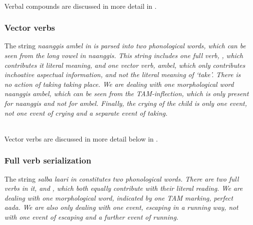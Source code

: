 \\

Verbal compounds are discussed in more detail in .

\subsubsection{Vector verbs}\label{sec:wc:mvc:Vectorverbs}
The string \em naanggis ambel \em in  is parsed into two phonological words, which can be seen from the long vowel in \em naanggis\em. This string includes one full verb, , which contributes it literal meaning, and one vector verb, \em ambel\em, which only contributes inchoative aspectual information, and not the literal meaning of `take'. There is no action of taking taking place. We are dealing with one morphological word   \em naanggis ambel\em, which can be seen from the TAM-inflection, which is only present for \em naanggis \em and not for \em ambel\em. Finally, the crying of the child is only one event, not one event of crying and a separate event of taking.

 \\
Vector verbs are discussed in more detail below in .
 
\subsubsection{Full verb serialization}\label{sec:wc:mvc:Fullverbserialization}
The string \em salba laari \em in  constitutes two phonological words. There are two full verbs in it,  and , which both equally contribute with their literal reading. We are dealing with one morphological word, indicated by one TAM marking, perfect \em aada\em. We are also only dealing with one event, escaping in a running way, not with one event  of escaping and a further event of running.

